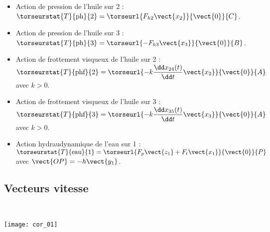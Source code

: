 \begin{multicols}{2}
\footnotesize
\begin{itemize}
\item Action de pression de l'huile sur 2 : $\torseurstat{T}{\text{ph}}{2}=\torseurl{F_{h2}\vect{x_2}}{\vect{0}}{C}$.
\item Action de pression de l'huile sur 3 : $\torseurstat{T}{\text{ph}}{3}=\torseurl{-F_{h3}\vect{x_3}}{\vect{0}}{B}$.
\item Action de frottement visqueux de l'huile sur 2 : $\torseurstat{T}{\text{phf}}{2}=\torseurl{-k\dfrac{\dd x_{24}(t)}{\dd t}\vect{x_2}}{\vect{0}}{A}$ avec $k>0$.
\item Action de frottement visqueux de l'huile sur 3 : $\torseurstat{T}{\text{phf}}{3}=\torseurl{-k\dfrac{\dd x_{35}(t)}{\dd t}\vect{x_3}}{\vect{0}}{A}$ avec $k>0$.
\item Action hydraudynamique de l'eau sur 1 : $\torseurstat{T}{\text{eau}}{1}=\torseurl{F_p\vect{z_1}+F_t\vect{x_1}}{\vect{0}}{P}$ avec $\vect{OP}=-h\vect{y_1}$.
\end{itemize}

\normalsize
%
%
%
%
%




\fi



\ifnormal

\subsection*{Vecteurs vitesse}

\ifprof
\begin{corrige} ~\\

\begin{center}
\texttt{[image: cor\_01]}
\end{center}
\end{corrige}
\else
\fi




\end{multicols}
